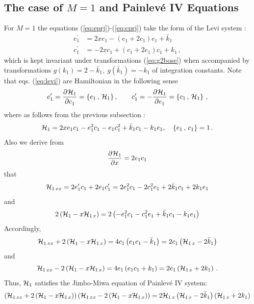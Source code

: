 \documentclass[12pt]{article}
\numberwithin{equation}{section}
\def\rf#1{(\ref{eq:#1})}
\def\lab#1{\label{eq:#1}}
\providecommand*{\pder}[3][]{%
\frac{\partial^{#1}#2}{\partial #3^{#1}}}
\begin{document}
\subsection{The case of $M=1$ and Painlev\'e IV Equations}
For $M=1$ the equations \rf{eprj}-\rf{cprj} take  the form of the Levi system :
\begin{equation}
\begin{split}
e_1^\prime&=2xe_1-(e_1+2c_1) e_1+{\bar k}_1\\
c_1^\prime &= -2xc_1+(c_1+2e_1)c_1+k_1\, ,
\end{split}
\lab{levi}
\end{equation}
which  is kept invariant under transformations
\rf{g2bose} when accompanied by transformations 
$g(k_1) = 2-{\bar k}_1, \; g \left(  {\bar k}_1 \right)=-k_1$
of integration constants.
Note that eqs. \rf{levi} are Hamiltonian in the following sense
\[
e_1^\prime = \pder{{\cal H}_1}{c_1}=\left\{ e_1\, , \, {\cal
H}_1\right\}, \quad \quad 
c_1^\prime = -\pder{{\cal H}_1}{e_1}=\left\{ c_1\, , \, {\cal
H}_1\right\}\, ,
\]
where as follows from the previous subsection :
\begin{equation}
{\cal H}_1 = 2 x e_1 c_1-e_1^2 c_1-e_1 c_1^2 + {\bar k}_1 c_1 - k_1
e_1, \quad
\left\{ e_1\, , \,c_1\right\}=1\, .
\lab{newham1}
\end{equation}
Also we derive from 
\[ \pder{{\cal H}_1}{x}= 2 e_1 c_1
\]
that 
\[{\cal H}_{1\,xx}= 2  e_1^\prime c_1 + 2 e_1 c_1^\prime
=2 e_1^2 c_1 -2 c_1^2 e_1+2 {\bar k}_1 c_1+2 k_1 e_1
\]
and
\[
2 \left( {\cal H}_1 - x {\cal H}_{1\,x}\right)  =2 \left( - e_1^2 c_1 - c_1^2 e_1
+{\bar k}_1 c_1 - k_1 e_1 \right) 
\]
Accordingly,
\[
{\cal H}_{1\,xx} +2 \left( {\cal H}_1 - x {\cal H}_{1\,x}\right)  = 4 c_1 \left( 
e_1 c_1 - {\bar k}_1  \right) = 2 c_1 \left( {\cal H}_{1\,x}- 2 
{\bar k}_1  \right)
\]
and 
\[
{\cal H}_{1\,xx} -2 \left( {\cal H}_1 - x {\cal H}_{1\,x}\right)  = 
 4 e_1 \left( e_1 c_1 + k_1  \right)  = 2 e_1 \left( {\cal H}_{1\,x}+2 
k_1  \right)\, .
\]
Thus, ${\cal H}_1$ satisfies the Jimbo-Miwa equation \cite{jimbo} 
of  Painlev\'e IV system:
\[\left({\cal H}_{1\,xx} +2 \left( {\cal H}_1 - x {\cal H}_{1\,x}  \right)\right)
\left({\cal H}_{1\,xx} -2 \left( {\cal H}_1 - x {\cal H}_{1\,x}  \right)\right)
=
2 {\cal H}_{1\,x} \left( {\cal H}_{1\,x}- 2 
{\bar k}_1  \right)\left( {\cal H}_{1\,x}+2 
k_1  \right)
\]
\end{document}
